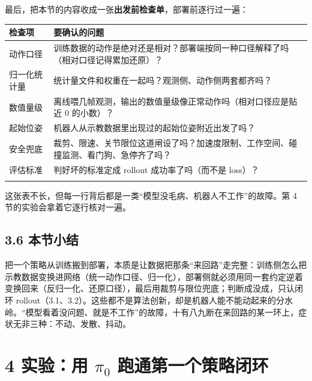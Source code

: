 \documentclass[
  chinese,
]{ctexart}
\begin{document}
最后，把本节的内容收成一张\textbf{出发前检查单}，部署前逐行过一遍：

\begin{center}
\begin{tabular}{@{}>{\raggedright\arraybackslash}p{} >{\raggedright\arraybackslash}p{}@{}}
\toprule\noalign{}
检查项 & 要确认的问题 \\
\midrule\noalign{}
动作口径 & 训练数据的动作是绝对还是相对？部署端按同一种口径解释了吗（相对口径记得累加还原）？ \\
归一化统计量 & 统计量文件和权重在一起吗？观测侧、动作侧两套都齐吗？ \\
数值量级 & 离线喂几帧观测，输出的数值量级像正常动作吗（相对口径应是贴近 0 的小数）？ \\
起始位姿 & 机器人从示教数据里出现过的起始位姿附近出发了吗？ \\
安全兜底 & 裁剪、限速、关节限位这道闸设了吗？加速度限制、工作空间、碰撞监测、看门狗、急停齐了吗？ \\
评估标准 & 判好坏的标准定成 rollout 成功率了吗（而不是 loss）？ \\
\bottomrule\noalign{}
\end{tabular}
\end{center}

这张表不长，但每一行背后都是一类``模型没毛病、机器人不工作''的故障。第 4
节的实验会拿着它逐行核对一遍。

\subsection{3.6 本节小结}\label{ux672cux8282ux5c0fux7ed3-1}

把一个策略从训练搬到部署，本质是让数据把那条``来回路''走完整：训练侧怎么把示教数据变换进网络（统一动作口径、归一化），部署侧就必须用同一套约定逆着变换回来（反归一化、还原口径），最后用裁剪与限位兜底；判断成没成，只认闭环
rollout（3.1、3.2）。这些都不是算法创新，却是机器人能不能动起来的分水岭。``模型看着没问题、就是不工作''的故障，十有八九断在来回路的某一环上，症状无非三种：不动、发散、抖动。

\section{\texorpdfstring{4 实验：用 \(\pi_0\)
跑通第一个策略闭环}{4 实验：用 \textbackslash pi\_0 跑通第一个策略闭环}}\label{ux5b9eux9a8cux7528-pi_0-ux8dd1ux901aux7b2cux4e00ux4e2aux7b56ux7565ux95edux73af}
\end{document}
